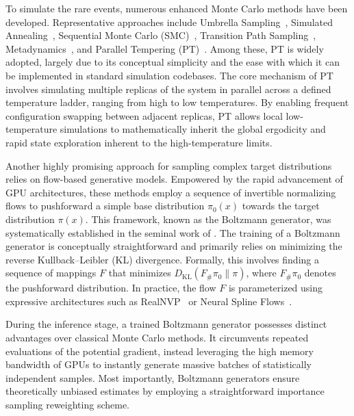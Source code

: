 \documentclass[%
 reprint,
 amsmath,amssymb,
 aps,
 pre,
]{revtex4-2}
\begin{document}
To simulate the rare events, numerous enhanced Monte Carlo methods have been developed. Representative approaches include Umbrella Sampling~\cite{torrie1977nonphysical, virnau2004calculation, kastner2011umbrella}, Simulated Annealing~\cite{van1987simulated, bertsimas1993simulated, nikolaev2010simulated}, Sequential Monte Carlo (SMC)~\cite{doucet2001introduction, cappe2007overview, chopin2020introduction, wills2023sequential}, Transition Path Sampling~\cite{dellago2002transition}, Metadynamics~\cite{laio2002escaping}, and Parallel Tempering (PT)~\cite{earl2005parallel, miasojedow2013adaptive, syed2022non, deng2023non}. Among these, PT is widely adopted, largely due to its conceptual simplicity and the ease with which it can be implemented in standard simulation codebases. The core mechanism of PT involves simulating multiple replicas of the system in parallel across a defined temperature ladder, ranging from high to low temperatures. By enabling frequent configuration swapping between adjacent replicas, PT allows local low-temperature simulations to mathematically inherit the global ergodicity and rapid state exploration inherent to the high-temperature limits.

Another highly promising approach for sampling complex target distributions relies on flow-based generative models. Empowered by the rapid advancement of GPU architectures, these methods employ a sequence of invertible normalizing flows to pushforward a simple base distribution $\pi_0(x)$ towards the target distribution $\pi(x)$. This framework, known as the Boltzmann generator, was systematically established in the seminal work of \cite{noe2019boltzmann}. The training of a Boltzmann generator is conceptually straightforward and primarily relies on minimizing the reverse Kullback--Leibler (KL) divergence. Formally, this involves finding a sequence of mappings $F$ that minimizes $D_{\text{KL}}(F_{\#} \pi_0 \| \pi)$, where $F_{\#} \pi_0$ denotes the pushforward distribution. In practice, the flow $F$ is parameterized using expressive architectures such as RealNVP~\cite{dinh2016density} or Neural Spline Flows~\cite{durkan2019neural}.

During the inference stage, a trained Boltzmann generator possesses distinct advantages over classical Monte Carlo methods. It circumvents repeated evaluations of the potential gradient, instead leveraging the high memory bandwidth of GPUs to instantly generate massive batches of statistically independent samples. Most importantly, Boltzmann generators ensure theoretically unbiased estimates by employing a straightforward importance sampling reweighting scheme.
\end{document}
